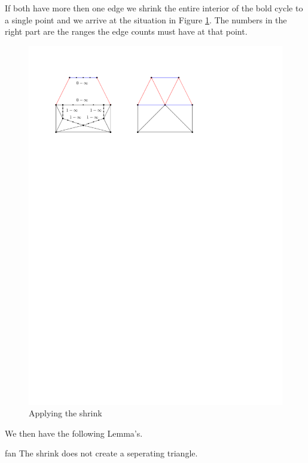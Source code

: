 If both have more then one edge we shrink the entire interior of the bold  cycle to a single point and we arrive at the situation in Figure \ref{fig:chord:shrink}. The numbers in the right part are the ranges the edge counts must have at that point.

\begin{figure}[h]
  \centering
  \includegraphics[scale=1]{chordShrink/img/shrink}
  \caption{Applying the shrink}
  \label{fig:chord:shrink}
\end{figure}


We then have the following Lemma's.

\begin{lemma}
  \label{lm:}fan
  The shrink does not create a seperating triangle.
\end{lemma}

